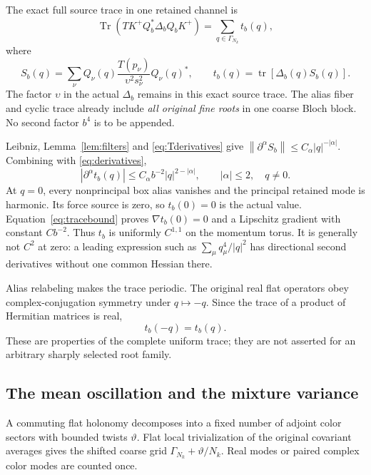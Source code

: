 \documentclass[11pt,letterpaper]{article}
\theoremstyle{remark}\newtheorem{remark}[theorem]{Remark}
\newcommand{\tr}{\operatorname{tr}}\newcommand{\Tr}{\operatorname{Tr}}
\newcommand{\norm}[1]{\left\lVert#1\right\rVert}
\begin{document}
The exact full source trace in one retained channel is
\[
 \Tr(TK^+Q_b^*\Delta_bQ_bK^+)=\sum_{q\in\Gamma_{N_k}}t_b(q),
\]
where
\begin{equation}\label{eq:trace}
 S_b(q)=\sum_\nu Q_\nu(q)\frac{T(p_\nu)}{\upsilon^2s_\nu^2}Q_\nu(q)^*,
 \qquad t_b(q)=\tr[\Delta_b(q)S_b(q)].
\end{equation}
The factor \(\upsilon\) in the actual \(\Delta_b\) remains in this exact source trace. The alias fiber and cyclic trace already include \emph{all original fine roots} in one coarse Bloch block. No second factor \(b^4\) is to be appended.

Leibniz, Lemma~\ref{lem:filters} and \eqref{eq:Tderivatives} give
\(\norm{\partial^\alpha S_b}\le C_\alpha|q|^{-|\alpha|}\). Combining with \eqref{eq:derivatives},
\begin{equation}\label{eq:tracebound}
 \boxed{\quad
 |\partial^\alpha t_b(q)|\le C_\alpha b^{-2}|q|^{2-|\alpha|},
 \qquad |\alpha|\le2,\quad q\ne0.
 \quad}
\end{equation}
At \(q=0\), every nonprincipal box alias vanishes and the principal retained mode is harmonic. Its force source is zero, so \(t_b(0)=0\) is the actual value. Equation~\eqref{eq:tracebound} proves \(\nabla t_b(0)=0\) and a Lipschitz gradient with constant \(Cb^{-2}\). Thus \(t_b\) is uniformly \(C^{1,1}\) on the momentum torus. It is generally not \(C^2\) at zero: a leading expression such as \(\sum_\mu q_\mu^4/|q|^2\) has directional second derivatives without one common Hessian there.

Alias relabeling makes the trace periodic. The original real flat operators obey complex-conjugation symmetry under \(q\mapsto-q\). Since the trace of a product of Hermitian matrices is real,
\begin{equation}\label{eq:even}
 t_b(-q)=t_b(q).
\end{equation}
These are properties of the complete uniform trace; they are not asserted for an arbitrary sharply selected root family.

\subsection{The mean oscillation and the mixture variance}

A commuting flat holonomy decomposes into a fixed number of adjoint color sectors with bounded twists \(\vartheta\). Flat local trivialization of the original covariant averages gives the shifted coarse grid
\(\Gamma_{N_k}+\vartheta/N_k\). Real modes or paired complex color modes are counted once.
\end{document}
